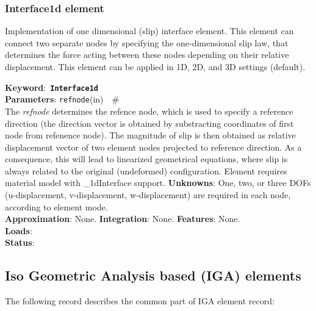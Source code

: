 \documentclass[a4paper]{article}
\newcommand{\descitem}[1]{{\noindent \bf #1}:}
\newcommand{\elemkeyword}[1]{\descitem{Keyword}~{\bf \texttt{#1}}}
\newcommand{\elemparam}[2]{{{\texttt{#1}\tiny (#2)}~~\#}}
\newcommand{\param}[1]{{\em #1}}
\begin{document}
\subsubsection{Interface1d element}
Implementation of one dimensional (slip) interface element. 
This element can connect two separate nodes by specifying the
one-dimensional slip law, that determines the force acting between
these nodes depending on their relative displacement. This element can
be applied in 1D, 2D, and 3D settings (default).

\elemkeyword{Interface1d}\\
\descitem{Parameters} \elemparam{refnode}{in}\\
The \param{refnode} determines the refence node, which is used to
specify a reference direction (the direction vector is obtained by
substracting coordinates of first node from refenence node).
The magnitude of slip is then obtained as relative displacement vector
of two element nodes projected to reference direction. As a
consequence, this will lead to linearized geometrical equations, where
slip is always related to the original (undeformed) configuration.
Element requires material model with \_1dInterface support.
\descitem{Unknowns}
One, two, or three DOFs (u-displacement, v-displacement,
w-displacement) are required in each node, according to element mode.\\
\descitem{Approximation} None.
\descitem{Integration} None.
\descitem{Features} None.\\
\descitem{Loads} \\
\descitem{Status} 


\subsection{Iso Geometric Analysis based (IGA) elements}
The following record describes the common part of IGA element record:
 
\end{document}
